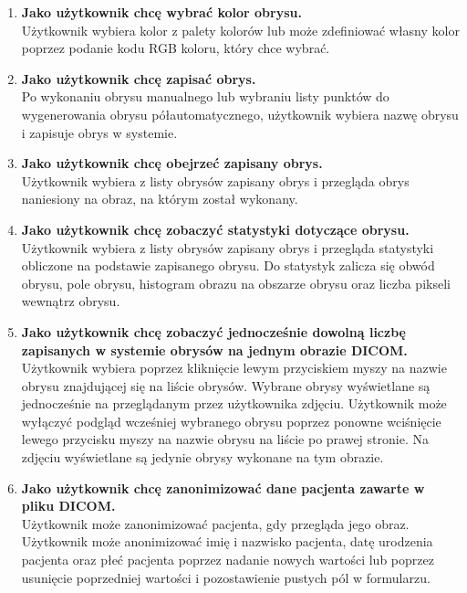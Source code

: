 \documentclass[a4paper,11pt,twoside,openright]{report}
\theoremstyle{definition}
\begin{document}
\begin{enumerate}
\item \textbf {Jako użytkownik chcę wybrać kolor obrysu.} \\
Użytkownik wybiera kolor z palety kolorów lub może zdefiniować własny kolor poprzez podanie kodu RGB koloru, który chce wybrać.

\item \textbf {Jako użytkownik chcę zapisać obrys.} \\
Po wykonaniu obrysu manualnego lub wybraniu listy punktów do wygenerowania obrysu półautomatycznego, użytkownik wybiera nazwę obrysu i zapisuje obrys w systemie.

\item \textbf {Jako użytkownik chcę obejrzeć zapisany obrys.} \\
Użytkownik wybiera z listy obrysów zapisany obrys i przegląda obrys naniesiony na obraz, na którym został wykonany.

\item \textbf {Jako użytkownik chcę zobaczyć statystyki dotyczące obrysu.} \\
Użytkownik wybiera z listy obrysów zapisany obrys i przegląda statystyki obliczone na podstawie zapisanego obrysu. Do statystyk zalicza się obwód obrysu, pole obrysu, histogram obrazu na obszarze obrysu oraz liczba pikseli wewnątrz obrysu.

\item \textbf {Jako użytkownik chcę zobaczyć jednocześnie dowolną liczbę zapisanych w systemie obrysów na jednym obrazie DICOM.} \\
Użytkownik wybiera poprzez kliknięcie lewym przyciskiem myszy na nazwie obrysu znajdującej się na liście obrysów. Wybrane obrysy wyświetlane są jednocześnie na przeglądanym przez użytkownika zdjęciu. Użytkownik może wyłączyć podgląd wcześniej wybranego obrysu poprzez ponowne wciśnięcie lewego przycisku myszy na nazwie obrysu na liście po prawej stronie. Na zdjęciu wyświetlane są jedynie obrysy wykonane na tym obrazie.

\item \textbf {Jako użytkownik chcę zanonimizować dane pacjenta zawarte w pliku DICOM.} \\
Użytkownik może zanonimizować pacjenta, gdy przegląda jego obraz. Użytkownik może anonimizować imię i nazwisko pacjenta, datę urodzenia pacjenta oraz płeć pacjenta poprzez nadanie nowych wartości lub poprzez usunięcie poprzedniej wartości i pozostawienie pustych pól w formularzu.

\end{enumerate}
\end{document}
